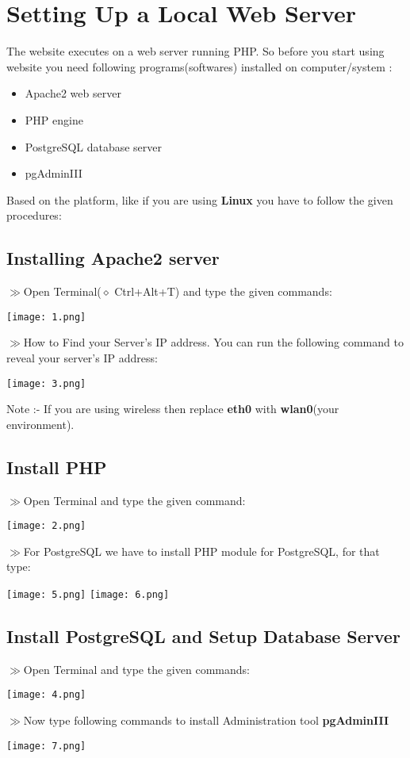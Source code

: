 \documentclass[]{article}
\begin{document}
\section{Setting Up a Local Web Server}
The website executes on a web server running PHP. So before you start using website you need following programs(softwares) installed on computer/system :
\begin{itemize}
\item Apache2 web server
\item PHP engine
\item PostgreSQL database server
\item pgAdminIII
\end{itemize}

Based on the platform, like if you are using \textbf{Linux} you have to follow the given procedures:\\
\subsection{Installing Apache2 server}
$\gg$Open Terminal($\diamond$ Ctrl+Alt+T) and type the given commands:
\begin{center}\texttt{[image: 1.png]}\end{center}
$\gg$How to Find your Server’s IP address. You can run the following command to reveal your server’s IP address:
\begin{center}\texttt{[image: 3.png]}\end{center}
Note :- If you are using wireless then replace \textbf{eth0} with \textbf{wlan0}(your environment).
\subsection{Install PHP}
$\gg$Open Terminal and type the given command:
\begin{center}\texttt{[image: 2.png]}\end{center}
$\gg$For PostgreSQL we have to install PHP module for PostgreSQL, for that type:
\begin{center}\texttt{[image: 5.png]}
\texttt{[image: 6.png]}\end{center}
\subsection{Install PostgreSQL and Setup Database Server}
$\gg$Open Terminal and type the given commands:
\begin{center}\texttt{[image: 4.png]}\end{center}
$\gg$Now type following commands to install Administration tool \textbf{pgAdminIII}
\begin{center}\texttt{[image: 7.png]}\end{center}
\end{document}
